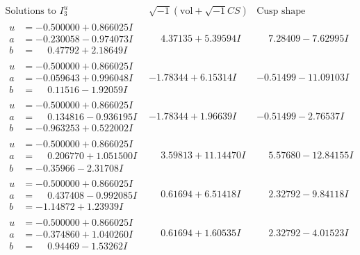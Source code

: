 \documentclass[1p]{elsarticle_modified}
\theoremstyle{definition}
\newcommand{\I}{\sqrt{-1}}
\begin{document}
$$\begin{array}{c|c|c}  
\text{Solutions to }I^u_{3}& \I (\text{vol} + \sqrt{-1}CS) & \text{Cusp shape}\\
 \hline 
\begin{aligned}
u &= -0.500000 + 0.866025 I \\
a &= -0.230058 - 0.974073 I \\
b &= \phantom{-}0.47792 + 2.18649 I\end{aligned}
 & \phantom{-}4.37135 + 5.39594 I & \phantom{-}7.28409 - 7.62995 I \\ \hline\begin{aligned}
u &= -0.500000 + 0.866025 I \\
a &= -0.059643 + 0.996048 I \\
b &= \phantom{-}0.11516 - 1.92059 I\end{aligned}
 & -1.78344 + 6.15314 I & -0.51499 - 11.09103 I \\ \hline\begin{aligned}
u &= -0.500000 + 0.866025 I \\
a &= \phantom{-}0.134816 - 0.936195 I \\
b &= -0.963253 + 0.522002 I\end{aligned}
 & -1.78344 + 1.96639 I & -0.51499 - 2.76537 I \\ \hline\begin{aligned}
u &= -0.500000 + 0.866025 I \\
a &= \phantom{-}0.206770 + 1.051500 I \\
b &= -0.35966 - 2.31708 I\end{aligned}
 & \phantom{-}3.59813 + 11.14470 I & \phantom{-}5.57680 - 12.84155 I \\ \hline\begin{aligned}
u &= -0.500000 + 0.866025 I \\
a &= \phantom{-}0.437408 - 0.992085 I \\
b &= -1.14872 + 1.23939 I\end{aligned}
 & \phantom{-}0.61694 + 6.51418 I & \phantom{-}2.32792 - 9.84118 I \\ \hline\begin{aligned}
u &= -0.500000 + 0.866025 I \\
a &= -0.374860 + 1.040260 I \\
b &= \phantom{-}0.94469 - 1.53262 I\end{aligned}
 & \phantom{-}0.61694 + 1.60535 I & \phantom{-}2.32792 - 4.01523 I \\ \hline\begin{aligned}

\end{aligned}
\end{array}$$
\end{document}
